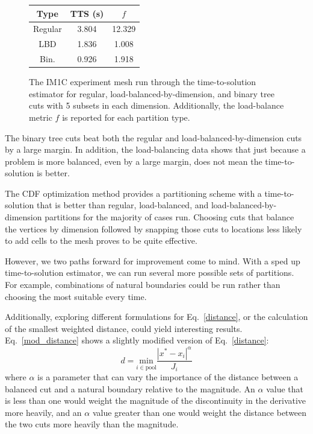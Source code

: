 \begin{figure}[ht]
\begin{minipage}[c]{0.65\textwidth}
\end{minipage}
%
\begin{minipage}[c]{0.33\textwidth}
\centering
\begin{table}[H]
\centering
\begin{tabular}{c|c|c}
\textbf{Type} & \bf TTS (s) & \bf $f$ \\ \hline
Regular & 3.804 & 12.329\\ \hline
LBD & 1.836 & 1.008\\ \hline
Bin. & 0.926 & 1.918\\ \hline
\end{tabular}
\end{table}
\end{minipage}
\caption{The IM1C experiment mesh run through the time-to-solution estimator for regular, load-balanced-by-dimension, and binary tree cuts with 5 subsets in each dimension. Additionally, the load-balance metric $f$ is reported for each partition type.}
\label{im1c_opt}
\end{figure}
The binary tree cuts beat both the regular and load-balanced-by-dimension cuts by a large margin. In addition, the load-balancing data shows that just because a problem is more balanced, even by a large margin, does not mean the time-to-solution is better.

The CDF optimization method provides a partitioning scheme with a time-to-solution that is better than regular, load-balanced, and load-balanced-by-dimension partitions for the majority of cases run.
Choosing cuts that balance the vertices by dimension followed by snapping those cuts to locations less likely to add cells to the mesh proves to be quite effective.

However, we two paths forward for improvement come to mind.
With a sped up time-to-solution estimator, we can run several more possible sets of partitions.
For example, combinations of natural boundaries could be run rather than choosing the most suitable every time.

Additionally, exploring different formulations for Eq.~\ref{distance}, or the calculation of the smallest weighted distance, could yield interesting results.
Eq.~\ref{mod_distance} shows a slightly modified version of Eq.~\ref{distance}:
\begin{equation}
d = \underset{i \in \text{pool}}{\text{min}} \frac{|x^{*} - x_i|^{\alpha}}{J_i}
\label{mod_distance}
\end{equation}
where $\alpha$ is a parameter that can vary the importance of the distance between a balanced cut and a natural boundary relative to the magnitude. An $\alpha$ value that is less than one would weight the magnitude of the discontinuity in the derivative more heavily, and an $\alpha$ value greater than one would weight the distance between the two cuts more heavily than the magnitude.
